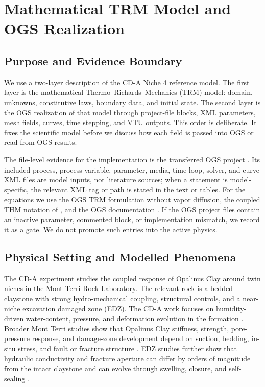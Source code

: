 \chapter{Mathematical TRM Model and OGS Realization}
\label{chap:ogs-model}

\section{Purpose and Evidence Boundary}
\label{sec:purpose-evidence}

We use a two-layer description of the CD-A Niche 4 reference model.  The first
layer is the mathematical Thermo--Richards--Mechanics (TRM) model: domain, unknowns,
constitutive laws, boundary data, and initial state.  The second layer is the OGS
realization of that model through project-file blocks, XML parameters, mesh fields,
curves, time stepping, and VTU outputs.  This order is deliberate.  It fixes the
scientific model before we discuss how each field is passed into OGS or read from
OGS results.

The file-level evidence for the implementation is the transferred OGS project
.  Its included process, process-variable,
parameter, media, time-loop, solver, and curve XML files are model inputs, not
literature sources; when a statement is model-specific, the relevant XML tag or
path is stated in the text or tables.  For the equations we use the OGS TRM
formulation without
vapor diffusion, the coupled THM notation of
\citet[Sec.~2.1--2.3, Eqs.~1, 7--9]{Wang2009THM}, and the OGS documentation
\citep[``Governing equations without vapor diffusion'']{OpenGeoSysTRMDocs}.
If the OGS project files contain an inactive parameter, commented block, or
implementation mismatch, we record it as a gate.  We do not promote such entries
into the active physics.

\section{Physical Setting and Modelled Phenomena}
\label{sec:physical-setting}

The CD-A experiment studies the coupled response of Opalinus Clay around twin niches
in the Mont Terri Rock Laboratory.  The relevant rock is a bedded claystone with
strong hydro-mechanical coupling, structural controls, and a near-niche excavation
damaged zone (EDZ).  The CD-A work focuses on humidity-driven water-content,
pressure, and deformation evolution in the formation
\citep[abstract]{Ziefle2021CDA}
\citep[abstract, Sec.~2, Table~1]{Ziefle2024Characterization}
\citep[abstract and Secs.~1--2]{WaterContentEDZ2024}.  Broader Mont Terri
studies show that Opalinus Clay stiffness, strength, pore-pressure response, and
damage-zone development depend on suction, bedding, in-situ stress, and fault or
fracture structure \citep[abstract, Secs.~2--3.3]{Amann2017Opalinus}.  EDZ
studies further show that hydraulic conductivity and fracture aperture can differ
by orders of magnitude from the intact claystone and can evolve through swelling,
closure, and self-sealing
\citep[abstract and Sec.~3.1.1]{Hale2021EDZ}
\citep[abstract, Secs.~2.1--2.5]{Marschall2017EDZ}.

